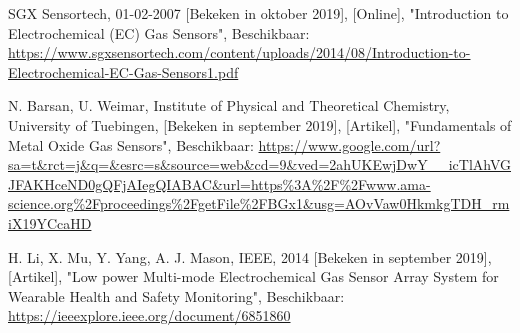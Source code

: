\documentclass[a4paper, 11pt]{article} %
\begin{document}
\begin{thebibliography}{9}
		SGX Sensortech,
		01-02-2007 [Bekeken in oktober 2019],
		[Online],
		"Introduction to Electrochemical (EC) Gas Sensors",
		Beschikbaar: \url{https://www.sgxsensortech.com/content/uploads/2014/08/Introduction-to-Electrochemical-EC-Gas-Sensors1.pdf}
		
		N. Barsan, U. Weimar,
		Institute of Physical and Theoretical Chemistry, University of Tuebingen,
		[Bekeken in september 2019],
		[Artikel],
		"Fundamentals of Metal Oxide Gas Sensors",
		Beschikbaar: \url{https://www.google.com/url?sa=t\&rct=j\&q=&esrc=s\&source=web\&cd=9\&ved=2ahUKEwjDwY__icTlAhVGJFAKHceND0gQFjAIegQIABAC\&url=https%3A%2F%2Fwww.ama-science.org%2Fproceedings%2FgetFile%2FBGx1&usg=AOvVaw0HkmkgTDH_rmiX19YCcaHD}
		
		\newpage
		H. Li, X. Mu, Y. Yang, A. J. Mason,
		IEEE,
		2014 [Bekeken in september 2019],
		[Artikel],
		"Low power Multi-mode Electrochemical Gas
		Sensor Array System for Wearable Health and
		Safety Monitoring",
		Beschikbaar: \url{https://ieeexplore.ieee.org/document/6851860}
		
	\end{thebibliography}
\end{document}
